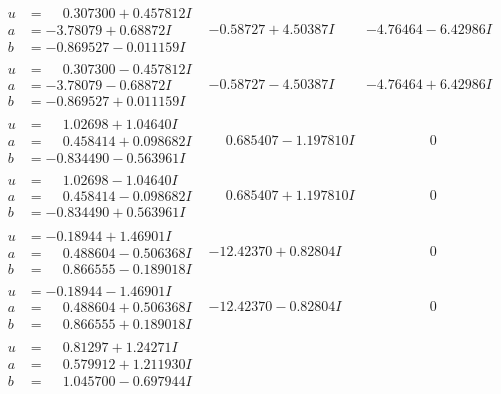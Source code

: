 \documentclass[1p]{elsarticle_modified}
\theoremstyle{definition}
\begin{document}
$$\begin{array}{c|c|c}
 \hline 
\begin{aligned}
u &= \phantom{-}0.307300 + 0.457812 I \\
a &= -3.78079 + 0.68872 I \\
b &= -0.869527 - 0.011159 I\end{aligned}
 & -0.58727 + 4.50387 I & -4.76464 - 6.42986 I \\ \hline\begin{aligned}
u &= \phantom{-}0.307300 - 0.457812 I \\
a &= -3.78079 - 0.68872 I \\
b &= -0.869527 + 0.011159 I\end{aligned}
 & -0.58727 - 4.50387 I & -4.76464 + 6.42986 I \\ \hline\begin{aligned}
u &= \phantom{-}1.02698 + 1.04640 I \\
a &= \phantom{-}0.458414 + 0.098682 I \\
b &= -0.834490 - 0.563961 I\end{aligned}
 & \phantom{-}0.685407 - 1.197810 I & \phantom{-0.000000 } 0 \\ \hline\begin{aligned}
u &= \phantom{-}1.02698 - 1.04640 I \\
a &= \phantom{-}0.458414 - 0.098682 I \\
b &= -0.834490 + 0.563961 I\end{aligned}
 & \phantom{-}0.685407 + 1.197810 I & \phantom{-0.000000 } 0 \\ \hline\begin{aligned}
u &= -0.18944 + 1.46901 I \\
a &= \phantom{-}0.488604 - 0.506368 I \\
b &= \phantom{-}0.866555 - 0.189018 I\end{aligned}
 & -12.42370 + 0.82804 I & \phantom{-0.000000 } 0 \\ \hline\begin{aligned}
u &= -0.18944 - 1.46901 I \\
a &= \phantom{-}0.488604 + 0.506368 I \\
b &= \phantom{-}0.866555 + 0.189018 I\end{aligned}
 & -12.42370 - 0.82804 I & \phantom{-0.000000 } 0 \\ \hline\begin{aligned}
u &= \phantom{-}0.81297 + 1.24271 I \\
a &= \phantom{-}0.579912 + 1.211930 I \\
b &= \phantom{-}1.045700 - 0.697944 I\end{aligned}

\end{array}$$
\end{document}
